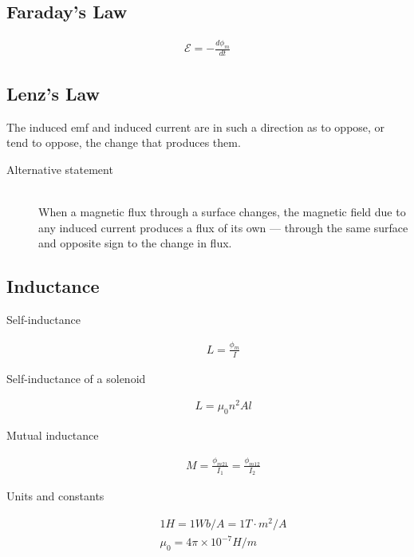 \documentclass[../main.tex]{subfiles}
\begin{document}
\subsection{Faraday's Law}
\label{sub:faraday_s_law}

\begin{align}
  \mathcal{E} = -\frac{d\phi_m}{dt}
\end{align}

\subsection{Lenz's Law}
\label{sub:lenz_s_law}

The induced emf and induced current are in such a direction as to oppose, or
tend to oppose, the change that produces them.

\begin{description}
  \item[Alternative statement] \hfill \\
    When a magnetic flux through a surface changes, the magnetic field due to
    any induced current produces a flux of its own --- through the same surface
    and opposite sign to the change in flux.
\end{description}

\subsection{Inductance}
\label{sub:inductance}

\begin{description}
  \item[Self-inductance]
    \begin{align}
      L = \frac{\phi_m}{I}
    \end{align}
  \item[Self-inductance of a solenoid]
    \begin{align}
      L = \mu_0n^2Al
    \end{align}
  \item[Mutual inductance]
    \begin{align}
      M = \frac{\phi_{m21}}{I_1}=\frac{\phi_{m12}}{I_2}
    \end{align}
  \item[Units and constants]
    \begin{align}
      1H = 1Wb/A = 1T\cdot m^2/A\\
      \mu_0 = 4\pi\times10^{-7}H/m
    \end{align}
\end{description}
\end{document}
